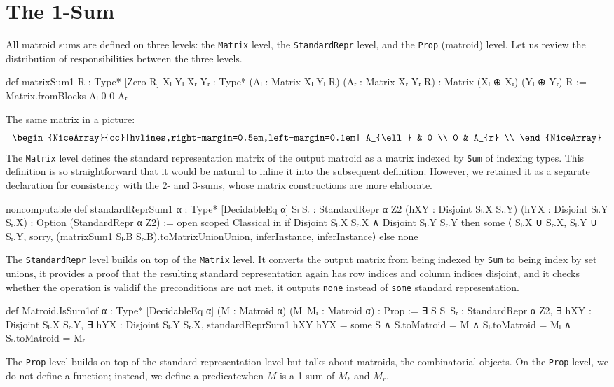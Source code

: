 \section{The 1-Sum}

All matroid sums are defined on three levels: the \texttt{Matrix} level, the \texttt{StandardRepr} level, and the \texttt{Prop} (matroid) level. Let us review the distribution of responsibilities between the three levels.
\begin{leancode}
def matrixSum1 {R : Type*} [Zero R]
    {Xₗ Yₗ Xᵣ Yᵣ : Type*}
    (Aₗ : Matrix Xₗ Yₗ R) (Aᵣ : Matrix Xᵣ Yᵣ R) :
    Matrix (Xₗ ⊕ Xᵣ) (Yₗ ⊕ Yᵣ) R :=
  Matrix.fromBlocks Aₗ 0 0 Aᵣ
\end{leancode}
The same matrix in a picture:
\[
    \begin{NiceArray}{cc}[hvlines,right-margin=0.5em,left-margin=0.1em]
        A_{\ell} & 0 \\
        0 & A_{r} \\
    \end{NiceArray}
\]
The \texttt{Matrix} level defines the standard representation matrix of the output matroid as a matrix indexed by \texttt{Sum} of indexing types. This definition is so  straightforward that it would be natural to inline it into the subsequent definition. However, we retained it as a separate declaration for consistency with the 2- and 3-sums, whose matrix constructions are more elaborate.
\begin{leancode}
noncomputable def standardReprSum1
    {α : Type*} [DecidableEq α]
    {Sₗ Sᵣ : StandardRepr α Z2}
    (hXY : Disjoint Sₗ.X Sᵣ.Y)
    (hYX : Disjoint Sₗ.Y Sᵣ.X) :
    Option (StandardRepr α Z2) :=
  open scoped Classical in if
    Disjoint Sₗ.X Sᵣ.X ∧ Disjoint Sₗ.Y Sᵣ.Y
  then
    some ⟨
      Sₗ.X ∪ Sᵣ.X,
      Sₗ.Y ∪ Sᵣ.Y,
      sorry,
      (matrixSum1 Sₗ.B Sᵣ.B).toMatrixUnionUnion,
      inferInstance,
      inferInstance⟩
  else
    none
\end{leancode}
The \texttt{StandardRepr} level builds on top of the \texttt{Matrix} level.
It converts the output matrix from being indexed by \texttt{Sum} to
being index by set unions, it provides a proof that the resulting
standard representation again has row indices and column indices disjoint,
and it checks whether the operation is valid\EmDash if the preconditions
are not met, it outputs \texttt{none} instead of \texttt{some} standard representation.
\begin{leancode}
def Matroid.IsSum1of {α : Type*} [DecidableEq α]
    (M : Matroid α) (Mₗ Mᵣ : Matroid α) :
    Prop :=
  ∃ S Sₗ Sᵣ : StandardRepr α Z2,
  ∃ hXY : Disjoint Sₗ.X Sᵣ.Y,
  ∃ hYX : Disjoint Sₗ.Y Sᵣ.X,
  standardReprSum1 hXY hYX = some S
  ∧ S.toMatroid = M
  ∧ Sₗ.toMatroid = Mₗ
  ∧ Sᵣ.toMatroid = Mᵣ
\end{leancode}
The \texttt{Prop} level builds on top of the standard representation level but
talks about matroids, the combinatorial objects. On the \texttt{Prop} level, we
do not define a function; instead, we define a predicate\EmDash when $M$ is
a 1-sum of $M_{\ell}$ and $M_{r}$.

